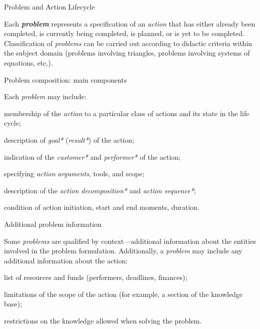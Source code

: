 \begin{frame}{Problem and Action Lifecycle}
	\topline
	\justifying
	
	Each \textbf{\textit{problem}} represents a specification of an \textit{action} that has either already been completed, is currently being completed, is planned, or is yet to be completed. Classification of \textit{problems} can be carried out according to didactic criteria within the subject domain (problems involving triangles, problems involving systems of equations, etc.).
	
\end{frame}

\begin{frame}{Problem composition: main components}
	\topline
	\justifying
	
	\vspace{10mm}
	
	Each \textit{problem} may include:
	\begin{textitemize}
		\item membership of the \textit{action} to a particular class of actions and its state in the life cycle;
		\item description of \textit{goal*} (\textit{result*}) of the action;
		\item indication of the \textit{customer*} and \textit{performer*} of the action;
		\item specifying \textit{action arguments\scnrolesign}, tools, and scope;
		\item description of the \textit{action decomposition*} and \textit{action sequence*};
		\item condition of action initiation, start and end moments, duration.
	\end{textitemize}
	
\end{frame}

\begin{frame}{Additional problem information}
	\topline
	\justifying
	
	Some \textit{problems} are qualified by context—additional information about the entities involved in the problem formulation. Additionally, a \textit{problem} may include any additional information about the action:
	\begin{textitemize}
		\item list of resources and funds (performers, deadlines, finances);
		\item limitations of the scope of the action (for example, a section of the knowledge base);
		\item restrictions on the knowledge allowed when solving the problem.
	\end{textitemize}
	
\end{frame}

